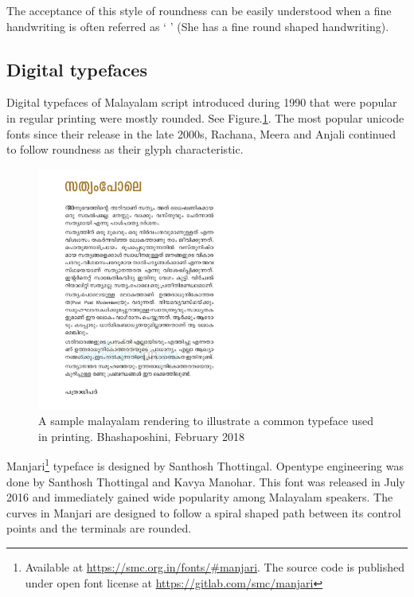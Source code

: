 \documentclass[11pt,twoside,a4paper,parskip=half]{scrartcl}
\begin{document}
The acceptance of this style of roundness can be easily understood when a fine handwriting is often referred as `{ }' (She has a fine round shaped handwriting).

 
\clearpage

\subsection{Digital typefaces}

Digital typefaces of Malayalam script introduced during 1990 that were popular in regular printing were mostly rounded. See Figure.\ref{malsample}. The most popular unicode fonts since their release in the late 2000s, Rachana, Meera and Anjali continued to follow roundness as their glyph characteristic.

\begin{figure}
	\includegraphics[width=0.6\textwidth]{images/malayalam-sample.png}
	\caption{A sample malayalam rendering to illustrate a common typeface used in printing. Bhashaposhini, February 2018}
	\label{malsample}
\end{figure}

 
Manjari\footnote{Available at \url{https://smc.org.in/fonts/\#manjari}. The source code is published under open font license at \url{https://gitlab.com/smc/manjari}} typeface is designed by Santhosh Thottingal. Opentype engineering was done by Santhosh Thottingal and Kavya Manohar. This font was released in July 2016 and immediately gained wide popularity among Malayalam speakers. The curves in Manjari are designed to follow a spiral shaped path between its control points and the terminals are rounded. %
\end{document}
